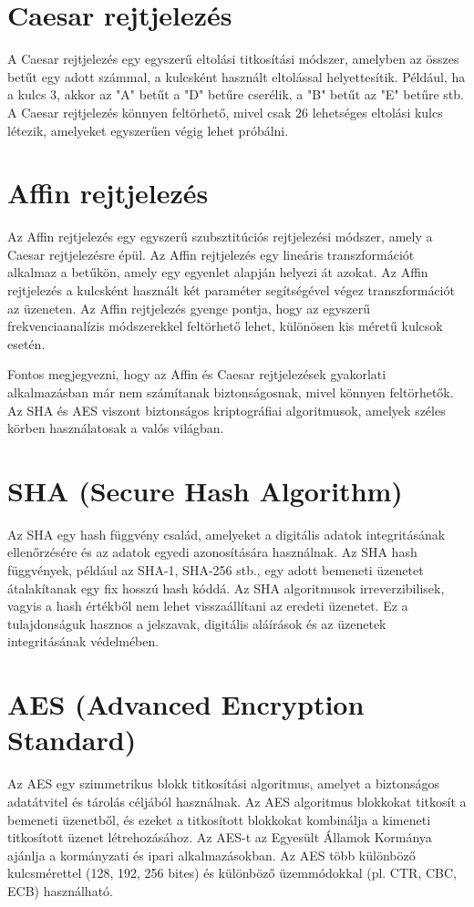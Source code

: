 \section {Caesar rejtjelezés}
A Caesar rejtjelezés egy egyszerű eltolási titkosítási módszer, amelyben az összes betűt egy adott számmal, a kulcsként használt eltolással helyettesítik. Például, ha a kulcs 3, akkor az "A" betűt a "D" betűre cserélik, a "B" betűt az "E" betűre stb. A Caesar rejtjelezés könnyen feltörhető, mivel csak 26 lehetséges eltolási kulcs létezik, amelyeket egyszerűen végig lehet próbálni.

\section {Affin rejtjelezés}
Az Affin rejtjelezés egy egyszerű szubsztitúciós rejtjelezési módszer, amely a Caesar rejtjelezésre épül. Az Affin rejtjelezés egy lineáris transzformációt alkalmaz a betűkön, amely egy egyenlet alapján helyezi át azokat. Az Affin rejtjelezés a kulcsként használt két paraméter segítségével végez transzformációt az üzeneten. Az Affin rejtjelezés gyenge pontja, hogy az egyszerű frekvenciaanalízis módszerekkel feltörhető lehet, különösen kis méretű kulcsok esetén.

\vspace{10pt}
Fontos megjegyezni, hogy az Affin és Caesar rejtjelezések gyakorlati alkalmazásban már nem számítanak biztonságosnak, mivel könnyen feltörhetők. Az SHA és AES viszont biztonságos kriptográfiai algoritmusok, amelyek széles körben használatosak a valós világban.

\section {SHA (Secure Hash Algorithm)}
 Az SHA egy hash függvény család, amelyeket a digitális adatok integritásának ellenőrzésére és az adatok egyedi azonosítására használnak. Az SHA hash függvények, például az SHA-1, SHA-256 stb., egy adott bemeneti üzenetet átalakítanak egy fix hosszú hash kóddá. Az SHA algoritmusok irreverzibilisek, vagyis a hash értékből nem lehet visszaállítani az eredeti üzenetet. Ez a tulajdonságuk hasznos a jelszavak, digitális aláírások és az üzenetek integritásának védelmében.

\section {AES (Advanced Encryption Standard)}
 Az AES egy szimmetrikus blokk titkosítási algoritmus, amelyet a biztonságos adatátvitel és tárolás céljából használnak. Az AES algoritmus blokkokat titkosít a bemeneti üzenetből, és ezeket a titkosított blokkokat kombinálja a kimeneti titkosított üzenet létrehozásához. Az AES-t az Egyesült Államok Kormánya ajánlja a kormányzati és ipari alkalmazásokban. Az AES több különböző kulcsmérettel (128, 192, 256 bites) és különböző üzemmódokkal (pl. CTR, CBC, ECB) használható.
